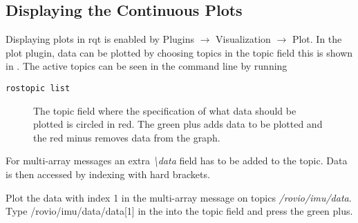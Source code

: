 
\subsection{Displaying the Continuous Plots}
Displaying plots in rqt is enabled by Plugins $\rightarrow$ Visualization $\rightarrow$ Plot. In the plot plugin, data can be plotted by choosing topics in the topic field this is shown in . The active topics can be seen in the command line by running 
\begin{lstlisting}
rostopic list
\end{lstlisting}
\begin{figure}
\centering
{}
\caption{The topic field where the specification of what data should be plotted is circled in red. The green plus adds data to be plotted and the red minus removes data from the graph.}
\label{fig:contplot}
\end{figure}

For multi-array messages an extra \textit{\textbackslash data} field has to be added to the topic. Data is then accessed by indexing with hard brackets. 
\begin{example}
Plot the data with index 1 in the multi-array message on topics \textit{/rovio/imu/data}. Type /rovio/imu/data/data[1] in the into the topic field and press the green plus.  
\end{example}


